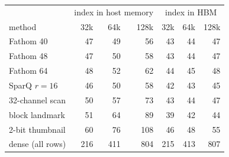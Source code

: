 \begin{tabular}{lrrrrrr}
\toprule
 & \multicolumn{3}{c}{index in host memory} & \multicolumn{3}{c}{index in HBM} \\
method & 32k & 64k & 128k & 32k & 64k & 128k \\
\midrule
Fathom 40 & 47 & 49 & 56 & 43 & 44 & 47 \\
Fathom 48 & 47 & 50 & 58 & 43 & 44 & 47 \\
Fathom 64 & 48 & 52 & 62 & 44 & 45 & 48 \\
SparQ $r{=}16$ & 46 & 50 & 58 & 42 & 43 & 45 \\
32-channel scan & 50 & 57 & 73 & 43 & 44 & 47 \\
block landmark & 51 & 64 & 89 & 39 & 42 & 44 \\
2-bit thumbnail & 60 & 76 & 108 & 46 & 48 & 55 \\
dense (all rows) & 216 & 411 & 804 & 215 & 413 & 807 \\
\bottomrule
\end{tabular}